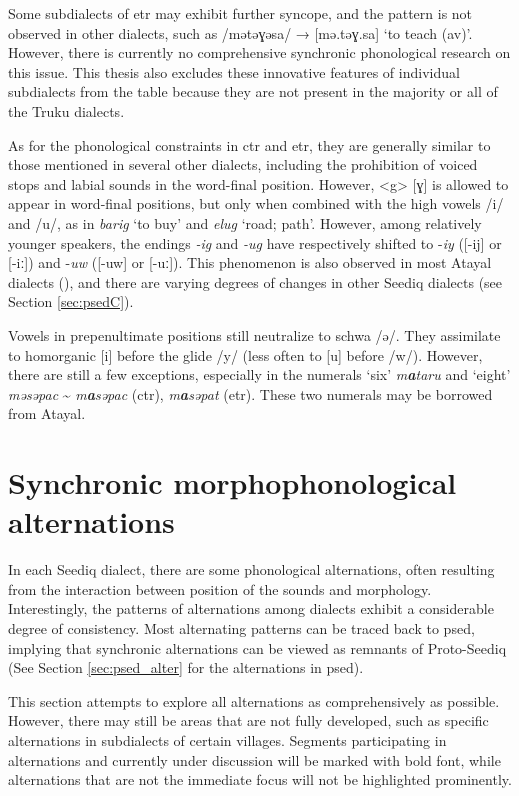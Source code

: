 Some subdialects of \acl{etr} may exhibit further syncope, and the pattern is not observed in other dialects, such as /mətəɣəsa/ → [mə.təɣ.sa] `to teach (\acs{av})'. However, there is currently no comprehensive synchronic phonological research on this issue. This thesis also excludes these innovative features of individual subdialects from the table because they are not present in the majority or all of the Truku dialects.

As for the phonological constraints in \acl{ctr} and \acl{etr}, they are generally similar to those mentioned in several other dialects, including the prohibition of voiced stops and labial sounds in the word-final position. However, <g> [ɣ] is allowed to appear in word-final positions, but only when combined with the high vowels /i/ and /u/, as in \textit{barig} `to buy' and \textit{elug} `road; path'. However, among relatively younger speakers, the endings \textit{-ig} and \textit{-ug} have respectively shifted to -\textit{iy} ([-ij] or [-iː]) and -\textit{uw} ([-uw] or [-uː]). This phenomenon is also observed in most Atayal dialects (\cite{li1982aicage,goderich2020phd}), and there are varying degrees of changes in other Seediq dialects (see Section \ref{sec:psedC}).

Vowels in prepenultimate positions still neutralize to schwa /ə/. They assimilate to homorganic [i] before the glide /y/ (less often to [u] before /w/). However, there are still a few exceptions, especially in the numerals `six' \textit{m\textbf{a}taru} and `eight' \textit{məsəpac} \~{} \textit{m\textbf{a}səpac} (\acs{ctr}), \textit{m\textbf{a}səpat} (\acs{etr}). These two numerals may be borrowed from Atayal.

\section{Synchronic morphophonological alternations} \label{sec:3.2}

In each Seediq dialect, there are some phonological alternations, often resulting from the interaction between position of the sounds and morphology. Interestingly, the patterns of alternations among dialects exhibit a considerable degree of consistency. Most alternating patterns can be traced back to \acl{psed}, implying that synchronic alternations can be viewed as remnants of Proto-Seediq (See Section \ref{sec:psed_alter} for the alternations in \acl{psed}).

This section attempts to explore all alternations as comprehensively as possible. However, there may still be areas that are not fully developed, such as specific alternations in subdialects of certain villages. Segments participating in alternations and currently under discussion will be marked with bold font, while alternations that are not the immediate focus will not be highlighted prominently. 

